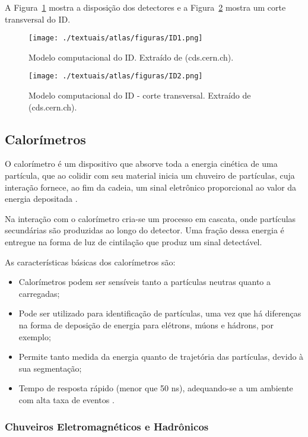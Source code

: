 A Figura~\ref{fig:2T08} mostra a disposição dos detectores e a Figura~\ref{fig:2T09} mostra um corte transversal do ID.

\begin{figure}[h!]
	\centering
	\texttt{[image: ./textuais/atlas/figuras/ID1.png]}\\
	\caption{Modelo computacional do ID. Extraído de (cds.cern.ch).}
	\label{fig:2T08}
\end{figure}

\begin{figure}[h!]
	\centering
	\texttt{[image: ./textuais/atlas/figuras/ID2.png]}\\
	\caption{Modelo computacional do ID - corte transversal. Extraído de (cds.cern.ch).}
	\label{fig:2T09}
\end{figure}

\subsection{Calorímetros}

O calorímetro é um dispositivo que absorve toda a energia cinética de uma partícula, que ao colidir com seu material inicia um chuveiro de partículas, cuja interação fornece, ao fim da cadeia, um sinal eletrônico proporcional ao valor da energia depositada \cite{das1994introduction}.

Na interação com o calorímetro cria-se um processo em cascata, onde partículas secundárias são produzidas ao longo do detector. Uma fração dessa energia é entregue na forma de luz de cintilação que produz um sinal detectável.

As características básicas dos calorímetros são:
\begin{itemize}
\item Calorímetros podem ser sensíveis tanto a partículas neutras quanto a carregadas;
\item Pode ser utilizado para identificação de partículas, uma vez que há diferenças na forma de deposição de energia para elétrons, múons e hádrons, por exemplo;
\item Permite tanto medida da energia quanto de trajetória das partículas, devido à sua segmentação;
\item Tempo de resposta rápido (menor que 50 ns), adequando-se a um ambiente com alta taxa de eventos \cite{peralva2012detecccao}.
\end{itemize}

\subsubsection{Chuveiros Eletromagnéticos e Hadrônicos}\label{subsec:chuveiros}

